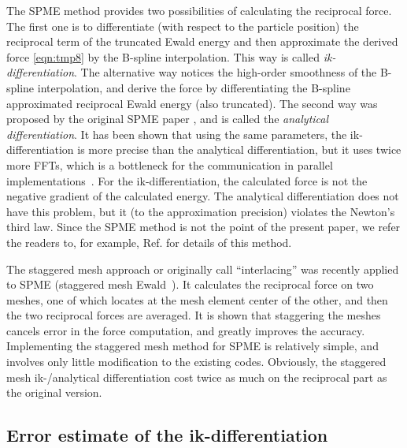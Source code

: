 \documentclass[aps,pre,preprint,unsortedaddress]{revtex4}
\begin{document}
The SPME method provides two possibilities of calculating the
reciprocal force. The first one is to differentiate (with respect to
the particle position) the reciprocal term of the truncated Ewald
energy and then approximate the derived force \eqref{eqn:tmp8} by the
B-spline interpolation. This way is called
\emph{ik-differentiation}.
The alternative way notices the high-order
smoothness of the B-spline interpolation, and derive the force by
differentiating the B-spline approximated reciprocal Ewald energy
(also truncated). The second way was proposed by the original SPME paper
\cite{essmann1995spm}, and is called the \emph{analytical
  differentiation}.
It has been shown that using the same parameters,
the ik-differentiation is more precise than the analytical
differentiation, but it uses twice more FFTs, which is a bottleneck
for the communication in parallel
implementations~\cite{wang2010optimizing}.
For the ik-differentiation, the calculated force is not the negative
gradient of the calculated energy. The analytical differentiation
does not have this problem, but it (to the approximation precision)
violates the Newton's third law.
Since the SPME method is
not the point of the present paper, we refer the readers to, for
example, Ref. \cite{essmann1995spm, deserno1998mue1,
  wang2010optimizing} for details of this method.

The staggered mesh approach or originally call ``interlacing'' was
recently applied to SPME (staggered mesh Ewald~\cite{cerutti2009staggered}).
It calculates the
reciprocal force on two meshes,
one of which locates at the mesh element center
of the other, and then the two reciprocal forces are averaged.
It is shown that staggering the meshes
cancels error in the force computation, and greatly improves the
accuracy.
Implementing the staggered mesh method for SPME is
relatively simple, and involves only little modification to the
existing codes.
Obviously, the staggered mesh ik-/analytical differentiation
cost twice as much on the
reciprocal part as the original version.

\subsection{Error estimate of the ik-differentiation}
\label{sec:error-ik}
\end{document}
